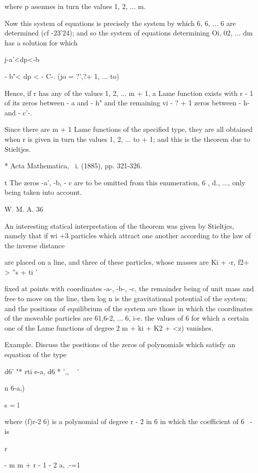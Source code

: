 {{{{{{{where p assumes in turn the values 1, 2, ... m.

Now this system of equations is precisely the system by which 6, 6,
... 6 are determined (cf -23'24); and so the system of
equations determining Oi, 02, ... dm has a solution for which

j-a'<dp<-b%

 - b"< dp < - C-. (jo = ?',?+ 1, ... to)

Hence, if r has any of the values 1, 2, ... m + 1, a Lame function
exists with r - 1 of its zeros between - a and - h" and the remaining
vi - ? + 1 zeros between - h- and - c'-.

Since there are m + 1 Lame functions of the specified type, they are
all obtained when r is given in turn the values 1, 2, ... to + 1; and
this is the theorem due to Stieltjes.

* Acta Mathematica, \ i. (1885), pp. 321-326.

t The zeros -a', -b, - c are to be omitted from this enumeration, 6
, d., ..., only being taken into account.

W. M. A. 36

%
%

An interesting statical interpretation of the theorem was given by
Stieltjcs, namely that if wi +3 particles which attract one another
according to the law of the inverse distance

are placed on a line, and three of these particles, whose masses are
Ki + -r, f2+ > ''s + ti '

fixed at points with coordinates -a-, -b-, -c, the remainder being of
unit mass and free to move on the line, then log n is the
gravitational potential of the system; and the positions of
equilibrium of the system are those in which the coordinates of the
moveable particles are 61,6-2, ... 6, i-e. the values of 6 for which
a certain one of the Lame functions of degree 2 m + ki + K2 + <z)
vanishes.

Example. Discuss the positions of the zeros of polynomials which
satisfy an equation of the type

d6' "* rti e-a, d6 * ',, ~ '

n 6-a,)

s = l

where (f)r-2 6) is a polynomial of degree r - 2 in 6 in which the
coefficient of 6 ~- is

r

- m m + r - 1 - 2 a, .-=1

}}}}}}}
